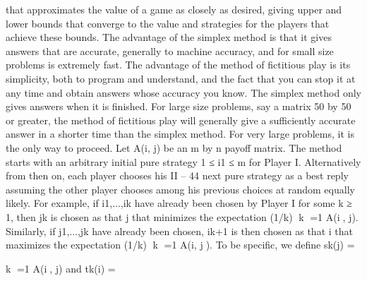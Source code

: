 that approximates the value of a game as closely as desired, giving upper and lower bounds
that converge to the value and strategies for the players that achieve these bounds.
The advantage of the simplex method is that it gives answers that are accurate,
generally to machine accuracy, and for small size problems is extremely fast. The advantage
of the method of fictitious play is its simplicity, both to program and understand, and the
fact that you can stop it at any time and obtain answers whose accuracy you know. The
simplex method only gives answers when it is finished. For large size problems, say a
matrix 50 by 50 or greater, the method of fictitious play will generally give a sufficiently
accurate answer in a shorter time than the simplex method. For very large problems, it is
the only way to proceed.
Let A(i, j) be an m by n payoff matrix. The method starts with an arbitrary initial
pure strategy 1 ≤ i1 ≤ m for Player I. Alternatively from then on, each player chooses his
II – 44
next pure strategy as a best reply assuming the other player chooses among his previous
choices at random equally likely. For example, if i1,...,ik have already been chosen by
Player I for some k ≥ 1, then jk is chosen as that j that minimizes the expectation
(1/k)
k
=1 A(i, j). Similarly, if j1,...,jk have already been chosen, ik+1 is then chosen
as that i that maximizes the expectation (1/k)
k
=1 A(i, j). To be specific, we define
sk(j) = 

k
=1
A(i, j) and tk(i) = 

